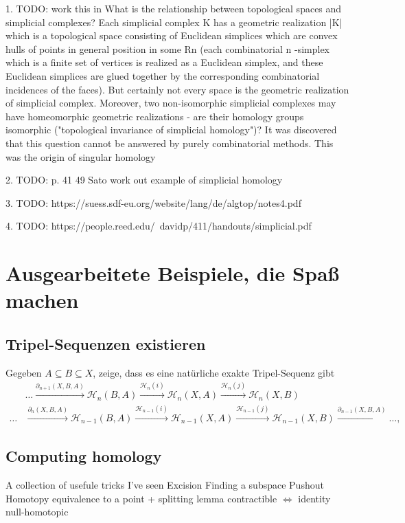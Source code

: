 1. TODO: work this in
What is the relationship between topological spaces and simplicial complexes? Each simplicial complex K
 has a geometric realization |K|
 which is a topological space consisting of Euclidean simplices which are convex hulls of points in general position in some Rn
 (each combinatorial n
-simplex which is a finite set of vertices is realized as a Euclidean simplex, and these Euclidean simplices are glued together by the corresponding combinatorial incidences of the faces). But certainly not every space is the geometric realization of simplicial complex. Moreover, two non-isomorphic simplicial complexes may have homeomorphic geometric realizations - are their homology groups isomorphic ("topological invariance of simplicial homology")? It was discovered that this question cannot be answered by purely combinatorial methods. This was the origin of singular homology

2. TODO: p. 41 49 Sato work out example of simplicial homology

3. TODO: https://suess.sdf-eu.org/website/lang/de/algtop/notes4.pdf

4. TODO: https://people.reed.edu/~davidp/411/handouts/simplicial.pdf



\newpage 
\section{Ausgearbeitete Beispiele, die Spaß machen}
\subsection{Tripel-Sequenzen existieren}
Gegeben $A\subseteq B \subseteq X$, zeige, dass es eine natürliche exakte Tripel-Sequenz gibt
$$
\begin{aligned}
& \ldots \stackrel{\partial_{n+1}(X, B, A)}{\longrightarrow} \mathcal{H}_n(B, A) \stackrel{\mathcal{H}_n(i)}{\longrightarrow} \mathcal{H}_n(X, A) \stackrel{\mathcal{H}_n(j)}{\longrightarrow} \mathcal{H}_n(X, B) \\
\ldots & \stackrel{\partial_n(X, B, A)}{\longrightarrow} \mathcal{H}_{n-1}(B, A) \stackrel{\mathcal{H}_{n-1}(i)}{\longrightarrow} \mathcal{H}_{n-1}(X, A) \stackrel{\mathcal{H}_{n-1}(j)}{\longrightarrow} \mathcal{H}_{n-1}(X, B) \stackrel{\partial_{n-1}(X, B, A)}{\longrightarrow} \ldots,
\end{aligned}
$$

\subsection{Computing homology}
\begin{outline}
    A collection of usefule tricks I've seen
    \1 Excision 
    \1 Finding a subspace
    \1 Pushout
    \1 Homotopy equivalence to a point + splitting lemma
        \2 contractible $\iff$ identity null-homotopic
\end{outline}
